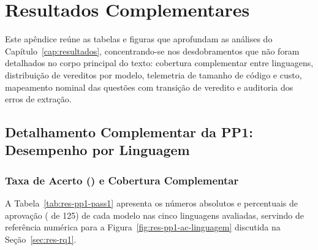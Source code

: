 \chapter{Resultados Complementares}\label{ap:resultados-complementares}

Este apêndice reúne as tabelas e figuras que aprofundam as análises do Capítulo~\ref{cap:resultados}, concentrando-se nos desdobramentos que não foram detalhados no corpo principal do texto: cobertura complementar entre linguagens, distribuição de vereditos por modelo, telemetria de tamanho de código e custo, mapeamento nominal das questões com transição de veredito e auditoria dos erros de extração.

\section{Detalhamento Complementar da PP1: Desempenho por Linguagem}\label{ap:pp1-detalhes}

\subsection{Taxa de Acerto (\texorpdfstring{}{Pass@1}) e Cobertura Complementar}\label{sec:res-rq1-pass1}

A Tabela~\ref{tab:res-pp1-pass1} apresenta os números absolutos e percentuais de aprovação ( de 125) de cada modelo nas cinco linguagens avaliadas, servindo de referência numérica para a Figura~\ref{fig:res-pp1-ac-linguagem} discutida na Seção~\ref{sec:res-rq1}.

